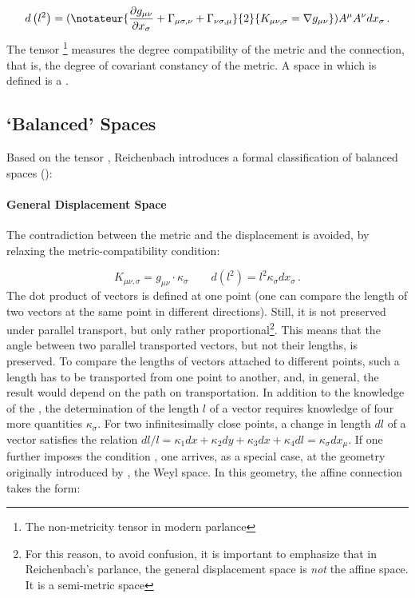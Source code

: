 \documentclass[final]{article}
\begin{document}
\begin{equation}\label{eq:nonmetricity}
{d}\left(l^{2}\right)=(\notateur{{\frac{\partial {g}_{\mu \nu}}{\partial {x}_{\sigma}}+\Gamma_{\mu \sigma, \nu}+\Gamma_{\nu \sigma, \mu}}}{2}{{K}_{\mu \nu, \sigma}=\nabla \gmn}) {A}^{\mu} {A}^{\nu} {d} {x}_{\sigma}\,.
\end{equation}
%
The tensor \nonmetr\footnote{The non-metricity tensor in modern parlance} measures the degree compatibility of the metric and the connection, that is, the degree of covariant constancy of the metric. A space in which \nonmetr is defined is a .
 
\subsection{`Balanced' Spaces}

Based on the tensor \nonmetr, Reichenbach introduces a formal classification of balanced spaces ():

\paragraph{General Displacement Space} The contradiction between the metric and the displacement is avoided, by relaxing the metric-compatibility condition: 

\begin{equation*}
K_{\mu \nu, \sigma}=g_{\mu \nu} \cdot \kappa_{\sigma} \quad \quad d\left({l}^{2}\right)={l}^{2} \kappa_\sigma dx_\sigma\,.
\end{equation*}
%
The dot product of vectors is defined at one point (one can compare the length of two vectors at the same point in different directions). Still, it is not preserved under parallel transport, but only rather proportional\footnote{For this reason, to avoid confusion, it is important to emphasize that in Reichenbach's parlance, the general displacement space is \emph{not} the affine space. It is a semi-metric space}. This means that the angle between two parallel transported vectors, but not their lengths, is preserved. To compare the lengths of vectors attached to different points, such a length has to be transported from one point to another, and, in general, the result would depend on the path on transportation. In addition to the knowledge of the \gmn, the determination of the length $l$ of a vector requires knowledge of four more quantities $\kappa_\sigma$. For two infinitesimally close points, a change in length $dl$ of a vector satisfies the relation $dl/l =\kappa_{1} d x+\kappa_{2} d y+\kappa_{3} d x+\kappa_{4} d l=\kappa_{\sigma} d x_{\mu}$. If one further imposes the condition \sym, one arrives, as a special case, at the geometry originally introduced by \citet{Weyl1918a}, the Weyl space. In this geometry, the affine connection takes the form:
\end{document}
